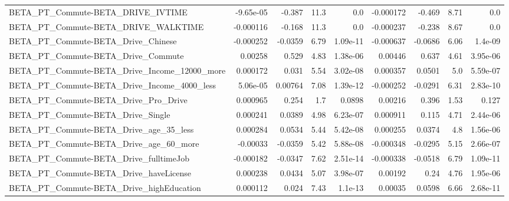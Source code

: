 \begin{tabular}{lrrrrrrrr}
BETA\_PT\_Commute-BETA\_DRIVE\_IVTIME                  &   -9.65e-05 &       -0.387 &      11.3 &      0.0 &  -0.000172 &      -0.469 &         8.71 &           0.0 \\
BETA\_PT\_Commute-BETA\_DRIVE\_WALKTIME                &   -0.000116 &       -0.168 &      11.3 &      0.0 &  -0.000237 &      -0.238 &         8.67 &           0.0 \\
BETA\_PT\_Commute-BETA\_Drive\_Chinese                 &   -0.000252 &      -0.0359 &      6.79 & 1.09e-11 &  -0.000637 &     -0.0686 &         6.06 &       1.4e-09 \\
BETA\_PT\_Commute-BETA\_Drive\_Commute                 &     0.00258 &        0.529 &      4.83 & 1.38e-06 &    0.00446 &       0.637 &         4.61 &      3.95e-06 \\
BETA\_PT\_Commute-BETA\_Drive\_Income\_12000\_more       &    0.000172 &        0.031 &      5.54 & 3.02e-08 &   0.000357 &      0.0501 &          5.0 &      5.59e-07 \\
BETA\_PT\_Commute-BETA\_Drive\_Income\_4000\_less        &    5.06e-05 &      0.00764 &      7.08 & 1.39e-12 &  -0.000252 &     -0.0291 &         6.31 &      2.83e-10 \\
BETA\_PT\_Commute-BETA\_Drive\_Pro\_Drive               &    0.000965 &        0.254 &       1.7 &   0.0898 &    0.00216 &       0.396 &         1.53 &         0.127 \\
BETA\_PT\_Commute-BETA\_Drive\_Single                  &    0.000241 &       0.0389 &      4.98 & 6.23e-07 &   0.000911 &       0.115 &         4.71 &      2.44e-06 \\
BETA\_PT\_Commute-BETA\_Drive\_age\_35\_less             &    0.000284 &       0.0534 &      5.44 & 5.42e-08 &   0.000255 &      0.0374 &          4.8 &      1.56e-06 \\
BETA\_PT\_Commute-BETA\_Drive\_age\_60\_more             &    -0.00033 &      -0.0359 &      5.42 & 5.88e-08 &  -0.000348 &     -0.0295 &         5.15 &      2.66e-07 \\
BETA\_PT\_Commute-BETA\_Drive\_fulltimeJob             &   -0.000182 &      -0.0347 &      7.62 & 2.51e-14 &  -0.000338 &     -0.0518 &         6.79 &      1.09e-11 \\
BETA\_PT\_Commute-BETA\_Drive\_haveLicense             &    0.000238 &       0.0434 &      5.07 & 3.98e-07 &    0.00192 &        0.24 &         4.76 &      1.95e-06 \\
BETA\_PT\_Commute-BETA\_Drive\_highEducation           &    0.000112 &        0.024 &      7.43 &  1.1e-13 &    0.00035 &      0.0598 &         6.66 &      2.68e-11 \\

\end{tabular}
